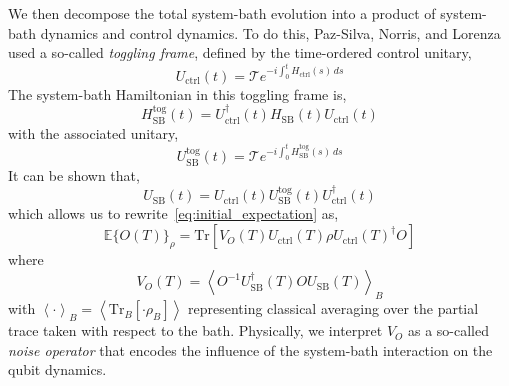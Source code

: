 \documentclass[12pt]{iopart}
\begin{document}
We then decompose the total system-bath evolution into a product of system-bath dynamics and control dynamics. To do this, Paz-Silva, Norris, and Lorenza~\cite{paz2017multiqubit} used a so-called \textit{toggling frame}, defined by the time-ordered control unitary,
\begin{equation} \label{eq:control_unitary_construction}
    U_{\mathrm{ctrl}}(t)=\mathcal{T} e^{-i \int_0^t H_{\mathrm{ctrl}}(s) \, ds}
\end{equation}
The system-bath Hamiltonian in this toggling frame is,
\begin{equation}\label{eq:interaction_hamiltonian}
    H_{\mathrm{SB}}^{\mathrm{tog}}(t) = U_{\mathrm{ctrl}}^{\dagger}(t) H_{\mathrm{SB}}(t) U_{\mathrm{ctrl}}(t)
\end{equation}
with the associated unitary,
\begin{equation}\label{eq:interaction_unitary}
    U_{\mathrm{SB}}^{\mathrm{tog}}(t)=\mathcal{T} e^{-i \int_0^t H_{\mathrm{SB}}^{\mathrm{tog}}(s) \, ds}
\end{equation}
It can be shown that,
\begin{equation}\label{eq:final_interaction_unitary}
    {U}_{\mathrm{SB}}(t)=U_{\mathrm{ctrl}}(t)  U_{\mathrm{SB}}^{\mathrm{tog}}(t) U_{\mathrm{ctrl}}^{\dagger}(t)
\end{equation}
which allows us to rewrite~\cref{eq:initial_expectation} as,
\begin{equation} \label{eq:expectation_with_noise}
    \mathbb{E}\{O(T)\}_\rho=\mathrm{Tr}\left[V_O(T) U_{\mathrm{ctrl}}(T) \rho U_{\mathrm{ctrl}}(T)^{\dagger} O\right]
\end{equation}
where
\begin{equation} \label{eq:VO_construction}
    V_{O}(T)=\left\langle O^{-1} {U}_{\mathrm{SB}}^{\dagger}(T) O {U}_{\mathrm{SB}}(T)\right\rangle_{B}
\end{equation}
with $\left\langle \cdot \right\rangle_{B}=\left\langle\mathrm{Tr}_{B}\left[\cdot \rho_{B}\right]\right\rangle$ representing classical averaging over the partial trace taken with respect to the bath. Physically, we interpret $V_{O}$ as a so-called \textit{noise operator} that encodes the influence of the system-bath interaction on the qubit dynamics.
\end{document}
